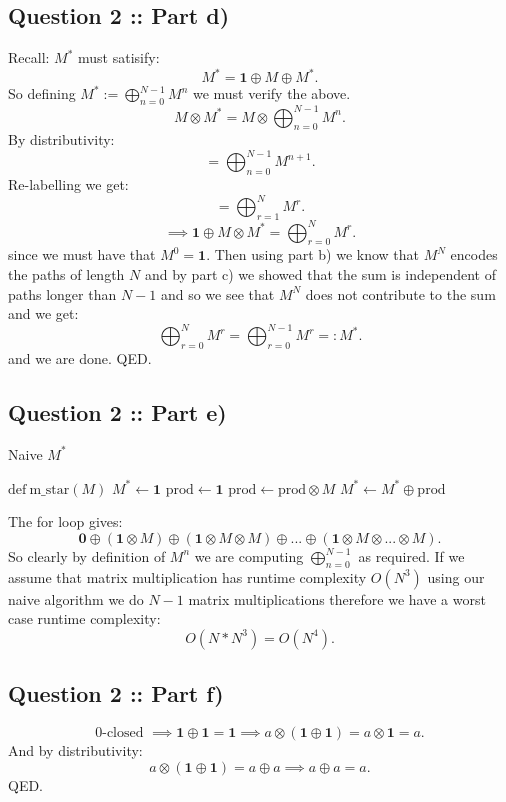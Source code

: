 \documentclass[a4paper]{article}
\begin{document}
\subsection*{Question 2 :: Part d)}
Recall: $M^*$ must satisify:
\[
M^* = \bm{1} \oplus M \oplus M^*
.\]
So defining $M^* := \bigoplus_{n=0}^{N-1} M^n$
we must verify the above.
\[
    M \otimes M^* = M \otimes \bigoplus_{n=0}^{N-1} M^n
.\]
By distributivity:
\[
    = \bigoplus_{n=0}^{N-1} M^{n+1}
.\]
Re-labelling we get:
\[
= \bigoplus_{r=1}^N M^r
.\]
\[
\implies \bm{1} \oplus M \otimes M^* = \bigoplus_{r=0}^N M^r
.\]
since we must have that $M^0 = \bm{1}$.
Then using part b) we know that $M^N$ encodes the paths of length $N$ 
and by part c) we showed that the sum is independent of paths longer than $N-1$ 
and so we see that $M^N$ does not contribute to the sum and we get:
 \[
\bigoplus_{r=0}^N M^r = \bigoplus_{r=0}^{N-1} M^r =: M^*
.\]
and we are done. QED.

\subsection*{Question 2 :: Part e)}
\begin{algorithm}
\caption{Naive $M^*$}
\begin{algorithmic}
    \State  $\mathrm{def~m\_star} (M)$
        \State $M^* \gets \bm{1}$
        \State $\text{prod} \gets \bm{1}$
            \State $\text{prod} \gets \text{prod} \otimes M$
            \State $M^* \gets M^* \oplus \text{prod}$
        \EndFor


\end{algorithmic}
\end{algorithm}

The for loop gives:
\[
\bm{0} \oplus (\bm{1} \otimes M) \oplus (\bm{1} \otimes M \otimes M) \oplus ... \oplus (\bm{1} \otimes M \otimes ... \otimes M)
.\]
So clearly by definition of $M^n$ we are computing $\bigoplus_{n=0}^{N-1}$ as required.
If we assume that matrix multiplication has runtime complexity $O(N^3)$ using our naive algorithm
we do $N-1$ matrix multiplications therefore we have a worst case runtime complexity:
\[
O(N * N^3) = O(N^4)
.\]

\subsection*{Question 2 :: Part f)}
 \[
\text{0-closed } \implies \bm{1} \oplus \bm{1} = \bm{1} \implies a \otimes (\bm{1} \oplus \bm{1}) = a\otimes \bm{1} = a
.\]
And by distributivity:
\[
a \otimes (\bm{1} \oplus \bm{1}) = a \oplus a \implies a \oplus a = a
.\]
QED.
\end{document}
